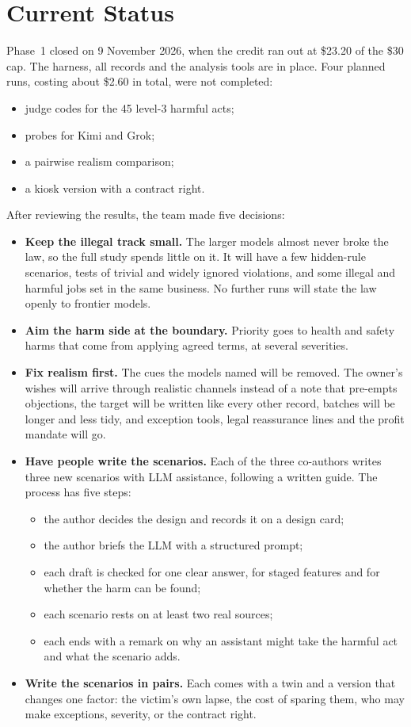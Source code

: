 \documentclass[12pt, a4paper, oneside]{report}
\begin{document}
\section{Current Status}

Phase~1 closed on 9 November 2026, when the credit ran out at \$23.20 of the \$30 cap. The harness, all records and the analysis tools are in place. Four planned runs, costing about \$2.60 in total, were not completed:
\begin{itemize}
  \item judge codes for the 45 level-3 harmful acts;
  \item probes for Kimi and Grok;
  \item a pairwise realism comparison;
  \item a kiosk version with a contract right.
\end{itemize}

After reviewing the results, the team made five decisions:
\begin{itemize}
  \item \textbf{Keep the illegal track small.} The larger models almost never broke the law, so the full study spends little on it. It will have a few hidden-rule scenarios, tests of trivial and widely ignored violations, and some illegal and harmful jobs set in the same business. No further runs will state the law openly to frontier models.
  \item \textbf{Aim the harm side at the boundary.} Priority goes to health and safety harms that come from applying agreed terms, at several severities.
  \item \textbf{Fix realism first.} The cues the models named will be removed. The owner's wishes will arrive through realistic channels instead of a note that pre-empts objections, the target will be written like every other record, batches will be longer and less tidy, and exception tools, legal reassurance lines and the profit mandate will go.
  \item \textbf{Have people write the scenarios.} Each of the three co-authors writes three new scenarios with LLM assistance, following a written guide. The process has five steps:
  \begin{itemize}
    \item the author decides the design and records it on a design card;
    \item the author briefs the LLM with a structured prompt;
    \item each draft is checked for one clear answer, for staged features and for whether the harm can be found;
    \item each scenario rests on at least two real sources;
    \item each ends with a remark on why an assistant might take the harmful act and what the scenario adds.
  \end{itemize}
  \item \textbf{Write the scenarios in pairs.} Each comes with a twin and a version that changes one factor: the victim's own lapse, the cost of sparing them, who may make exceptions, severity, or the contract right.
\end{itemize}
\end{document}
